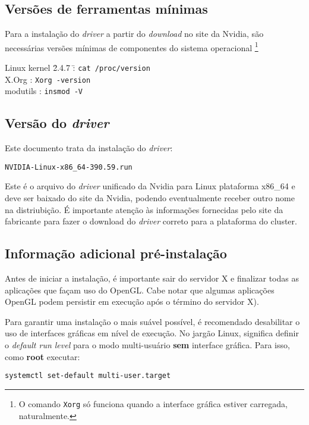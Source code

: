 \documentclass[twoside,a4paper,12pt,english]{inac17}
\begin{document}
\subsection{Versões de ferramentas mínimas}

Para a instalação do \textit{driver} a partir do \textit{download} 
no site da Nvidia, são necessárias versões mínimas de componentes 
do sistema operacional \footnote{O comando \texttt{Xorg} só funciona 
quando a interface gráfica estiver carregada, naturalmente.}

\begin{tabbing}
Linux kernel \= 2.4.7 \= : \= \texttt{cat /proc/version} \\
X.Org  \> : \> \texttt{Xorg -version} \\
modutils  \> : \> \texttt{insmod -V}
\end{tabbing}

\subsection{Versão do \textit{driver}}

Este documento trata da instalação do \textit{driver}:

\texttt{NVIDIA-Linux-x86\_64-390.59.run}

Este é o arquivo do \textit{driver} unificado da Nvidia para 
Linux plataforma x86\_64 e deve ser baixado do site da Nvidia, podendo  eventualmente receber outro nome na distriubição. É importante 
atenção às informações fornecidas pelo site da fabricante para 
fazer o download do \textit{driver} correto para a plataforma 
do cluster.

\subsection{Informação adicional pré-instalação}

Antes de iniciar a instalação, é importante sair do servidor X e 
finalizar todas as aplicações que façam uso do OpenGL. Cabe notar 
que algumas aplicações OpenGL podem persistir em execução após 
o término do servidor X).

Para garantir uma instalação o mais suável possível, é recomendado 
desabilitar o uso de interfaces gráficas em nível de execução. No 
jargão Linux, significa definir o \textit{default run level} para 
o modo multi-usuário \textbf{sem} interface gráfica. Para isso, 
como \textbf{root} executar:

\texttt{systemctl set-default multi-user.target}
\end{document}
